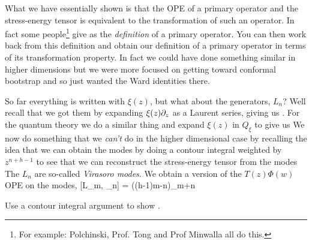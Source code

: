 What we have essentially shown is that the OPE of a primary operator and the stress-energy tensor is equivalent to the transformation of such an operator. In fact some people\footnote{For example: Polchinski, Prof. Tong and Prof Minwalla all do this.} give  as the \textit{definition} of a primary operator. You can then work back from this definition and obtain our definition of a primary operator in terms of its transformation property. In fact we could have done something similar in higher dimensions but we were more focused on getting toward conformal bootstrap and so just wanted the Ward identities there. 

So far everything is written with $\xi(z)$, but what about the generators, $L_n$? Well recall that we got them by expanding $\xi(z)\partial_z$ as a Laurent series, giving us . For the quantum theory we do a similar thing and expand $\xi(z)$ in $Q_{\xi}$ to give us 
We now do something that we \textit{can't} do in the higher dimensional case by recalling the idea that we can obtain the modes by doing a contour integral weighted by $z^{n+h-1}$ to see that we can reconstruct the stress-energy tensor from the modes
\noindent The $L_n$ are so-called \textit{Virasoro modes}. We obtain a version of the $T(z)\Phi(w)$ OPE on the modes,
\be 
\label{eqn:LmVarphinCommutator}
    [L_m, \varphi_n] = \big((h-1)m-n\big)\varphi_{m+n}
\ee 

\bbox 
    Use a contour integral argument to show .
\ebox 
